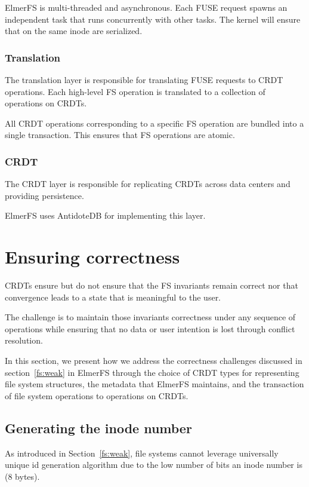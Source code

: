 \documentclass[sigconf, 10pt]{acmart}
\begin{document}
ElmerFS is multi-threaded and asynchronous. Each FUSE request spawns an independent task that runs concurrently with other tasks. The kernel will ensure that on the same inode
are serialized.

\subsubsection{Translation}
\label{sec:transaction_layer}
The translation layer is responsible for translating FUSE requests
to CRDT operations. Each high-level FS operation is translated
to a collection of operations on CRDTs.

All CRDT operations corresponding to a specific FS operation are bundled into
a single transaction. This ensures that FS operations are atomic.

\subsubsection{CRDT}

The CRDT layer is responsible for replicating CRDTs across data centers
and providing persistence.

ElmerFS uses AntidoteDB\cite{akkoorath2016cure, akkoorath2016antidote} for implementing this layer.

\section{Ensuring correctness}

CRDTs ensure  but do not ensure that the FS invariants remain correct
nor that convergence leads to a state that is meaningful to the user.

The challenge is to maintain those invariants correctness under any sequence
of operations while ensuring that no data or user intention is lost through
conflict resolution.

In this section, we present how we address the correctness challenges discussed in section~\ref{fs:weak}
in ElmerFS through the choice of CRDT types for representing file system structures,
the metadata that ElmerFS maintains, and the transaction of file system operations
to operations on CRDTs.

\subsection{Generating the inode number}
\label{sec:generation_inode_number}

As introduced in Section~\ref{fs:weak}, file systems cannot leverage
universally unique id generation algorithm due to the low number of bits
an inode number is (8 bytes).
\end{document}
